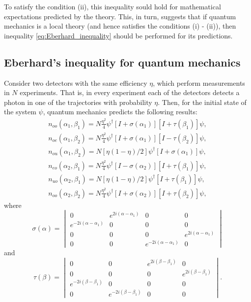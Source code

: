 \documentclass[%
master,         %
subf,           %
href,           %
colorlinks=true %
]{disser}
\numberwithin{equation}{section}
\numberwithin{figure}{section}
\begin{document}
To satisfy the condition (ii), this inequality sould hold for mathematical expectations predicted by the theory. This, in turn, suggests that if quantum mechanics is a local theory (and hence satisfies the conditions (i) - (ii)), then inequality \eqref{eq:Eberhard_inequality} should be performed for its predictions.

\subsection{Eberhard's inequality for quantum mechanics}
Consider two detectors with the same efficiency $\eta$, which perform measurements in $N$ experiments. That is, in every experiment each of the detectors detects a photon in one of the trajectories with probability $\eta$. Then, for the initial state of the system $\psi$, quantum mechanics predicts the following results:
\begin{eqnarray} \label{eq:Eberhard_n_start}
n_{oo}(\alpha_1, \beta_1) = N\frac{\eta^2}{4}\psi^\dagger[I + \sigma(\alpha_1)][I + \tau(\beta_1)]\psi,\\
n_{oe}(\alpha_1, \beta_2) = N\frac{\eta^2}{4}\psi^\dagger[I + \sigma(\alpha_1)][I - \tau(\beta_2)]\psi,\\
n_{ou}(\alpha_1, \beta_2) = N[\eta(1 - \eta)/2]\psi^\dagger[I + \sigma(\alpha_1)]\psi,\\ \label{eq:Eberhard_n_ou}
n_{eo}(\alpha_2, \beta_1) = N\frac{\eta^2}{4}\psi^\dagger[I - \sigma(\alpha_2)][I + \tau(\beta_1)]\psi,\\
n_{uo}(\alpha_2, \beta_1) = N[\eta(1 - \eta)/2]\psi^\dagger[I + \tau(\beta_1)]\psi,\\ \label{eq:Eberhard_n_uo}
n_{oo}(\alpha_2, \beta_2) = N\frac{\eta^2}{4}\psi^\dagger[I + \sigma(\alpha_2)][I + \tau(\beta_2)]\psi, \label{eq:Eberhard_n_finish}
\end{eqnarray}
where 
\[
\sigma(\alpha) = 
\begin{vmatrix}
0 & e^{2i(\alpha - \alpha_1)} & 0 & 0\\
e^{-2i(\alpha - \alpha_1)} & 0 & 0 & 0\\
0 & 0 & 0 & e^{2i(\alpha - \alpha_1)}\\
0 & 0 & e^{-2i(\alpha - \alpha_1)} & 0
\end{vmatrix}
\] 
and
\[
\tau(\beta) = 
\begin{vmatrix}
0 & 0 & e^{2i(\beta - \beta_1)} & 0\\
0 & 0 & 0 & e^{2i(\beta - \beta_1)}\\
e^{-2i(\beta - \beta_1)} & 0 & 0 & 0\\
0 & e^{-2i(\beta - \beta_1)} & 0 & 0
\end{vmatrix}.
\]
\end{document}
